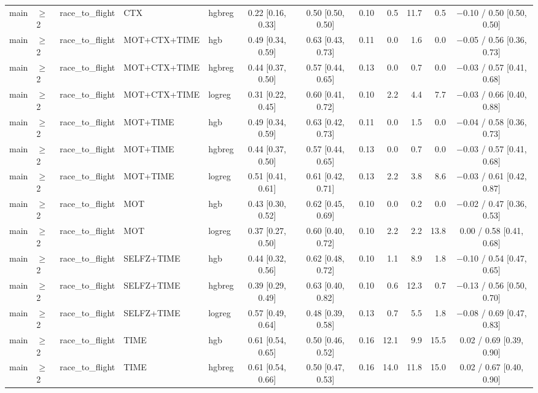 \begin{longtable}{@{}lllllcccrrrc@{}}
main & $\geq$2 & race\_to\_flight & CTX & hgbreg & 0.22 [0.16, 0.33] & 0.50 [0.50, 0.50] & 0.10 & 0.5 & 11.7 & 0.5 & $-$0.10 / 0.50 [0.50, 0.50] \\
main & $\geq$2 & race\_to\_flight & MOT+CTX+TIME & hgb & 0.49 [0.34, 0.59] & 0.63 [0.43, 0.73] & 0.11 & 0.0 & 1.6 & 0.0 & $-$0.05 / 0.56 [0.36, 0.73] \\
main & $\geq$2 & race\_to\_flight & MOT+CTX+TIME & hgbreg & 0.44 [0.37, 0.50] & 0.57 [0.44, 0.65] & 0.13 & 0.0 & 0.7 & 0.0 & $-$0.03 / 0.57 [0.41, 0.68] \\
main & $\geq$2 & race\_to\_flight & MOT+CTX+TIME & logreg & 0.31 [0.22, 0.45] & 0.60 [0.41, 0.72] & 0.10 & 2.2 & 4.4 & 7.7 & $-$0.03 / 0.66 [0.40, 0.88] \\
main & $\geq$2 & race\_to\_flight & MOT+TIME & hgb & 0.49 [0.34, 0.59] & 0.63 [0.42, 0.73] & 0.11 & 0.0 & 1.5 & 0.0 & $-$0.04 / 0.58 [0.36, 0.73] \\
main & $\geq$2 & race\_to\_flight & MOT+TIME & hgbreg & 0.44 [0.37, 0.50] & 0.57 [0.44, 0.65] & 0.13 & 0.0 & 0.7 & 0.0 & $-$0.03 / 0.57 [0.41, 0.68] \\
main & $\geq$2 & race\_to\_flight & MOT+TIME & logreg & 0.51 [0.41, 0.61] & 0.61 [0.42, 0.71] & 0.13 & 2.2 & 3.8 & 8.6 & $-$0.03 / 0.61 [0.42, 0.87] \\
main & $\geq$2 & race\_to\_flight & MOT & hgb & 0.43 [0.30, 0.52] & 0.62 [0.45, 0.69] & 0.10 & 0.0 & 0.2 & 0.0 & $-$0.02 / 0.47 [0.36, 0.53] \\
main & $\geq$2 & race\_to\_flight & MOT & logreg & 0.37 [0.27, 0.50] & 0.60 [0.40, 0.72] & 0.10 & 2.2 & 2.2 & 13.8 & 0.00 / 0.58 [0.41, 0.68] \\
main & $\geq$2 & race\_to\_flight & SELFZ+TIME & hgb & 0.44 [0.32, 0.56] & 0.62 [0.48, 0.72] & 0.10 & 1.1 & 8.9 & 1.8 & $-$0.10 / 0.54 [0.47, 0.65] \\
main & $\geq$2 & race\_to\_flight & SELFZ+TIME & hgbreg & 0.39 [0.29, 0.49] & 0.63 [0.40, 0.82] & 0.10 & 0.6 & 12.3 & 0.7 & $-$0.13 / 0.56 [0.50, 0.70] \\
main & $\geq$2 & race\_to\_flight & SELFZ+TIME & logreg & 0.57 [0.49, 0.64] & 0.48 [0.39, 0.58] & 0.13 & 0.7 & 5.5 & 1.8 & $-$0.08 / 0.69 [0.47, 0.83] \\
main & $\geq$2 & race\_to\_flight & TIME & hgb & 0.61 [0.54, 0.65] & 0.50 [0.46, 0.52] & 0.16 & 12.1 & 9.9 & 15.5 & 0.02 / 0.69 [0.39, 0.90] \\
main & $\geq$2 & race\_to\_flight & TIME & hgbreg & 0.61 [0.54, 0.66] & 0.50 [0.47, 0.53] & 0.16 & 14.0 & 11.8 & 15.0 & 0.02 / 0.67 [0.40, 0.90] \\

\end{longtable}
